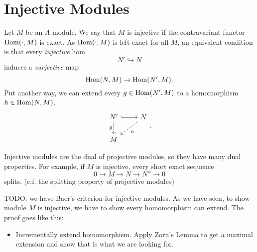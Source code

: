 \section{Injective Modules}
Let $M$ be an $A$-module. We say that $M$ is injective if the contravariant functor $\operatorname{Hom}(\cdot, M)$ is exact. As $\operatorname{Hom}(\cdot, M)$ is left-exact for all $M$, an equivalent condition is that every \textit{injective} hom
\[
    N' \hookrightarrow N
\]
induces a \textit{surjective} map
\[
    \operatorname{Hom}(N, M) \rightarrow \operatorname{Hom}(N', M).
\]
Put another way, we can extend every $g \in \operatorname{Hom}(N', M)$ to a homomorphism $h \in \operatorname{Hom}(N, M)$.
\[
    \begin{tikzcd}
        N' \arrow[r, hook] \arrow[d, "g"'] & N \arrow[ld, "h", dashed] \\
        M                                  &                          
    \end{tikzcd}.
\]

Injective modules are the dual of projective modules, so they have many dual properties. For example, if $M$ is injective, every short exact sequence
\[
    0 \rightarrow M \rightarrow N \rightarrow N'' \rightarrow 0
\]
splits. (c.f. the splitting property of projective modules)

TODO: we have Baer's criterion for injective modules. As we have seen, to show module $M$ is injective, we have to show every homomorphism can extend. The proof goes like this:
\begin{itemize}
    \item Incrementally extend homomorphism. Apply Zorn's Lemma to get a maximal extension and show that is what we are looking for.
\end{itemize}
